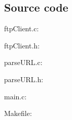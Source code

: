\documentclass[11pt,a4paper,reqno]{article}
\numberwithin{equation}{section}
\begin{document}
\begin{appendices}

\section{Source code}

\begin{Large}
ftpClient.c:
\end{Large}



\vspace{15mm}

\begin{Large}
ftpClient.h:
\end{Large}



\vspace{15mm}

\begin{Large}
parseURL.c:
\end{Large}



\vspace{15mm}

\begin{Large}
parseURL.h:
\end{Large}



\vspace{15mm}

\begin{Large}
main.c:
\end{Large}



\vspace{15mm}

\begin{Large}
Makefile:
\end{Large}



\vspace{15mm}

\end{appendices}
\end{document}

